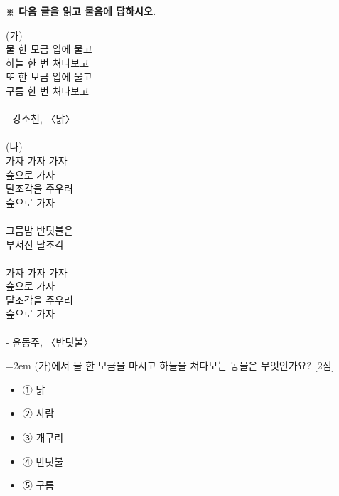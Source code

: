 \documentclass[12pt,a4paper]{article}
\newcommand{\qnum}[1]{%
  \tikz[baseline=(num.base)]{%
    \node[circle, fill=numCircle, text=white, inner sep=0pt,
          minimum size=18pt, font=\small\bfseries] (num) {#1};%
  }%
}
\newcommand{\pts}[1]{%
  \hfill\textcolor{ptsBadge}{[#1점]}%
}
\begin{document}
\vspace{4mm}
{\small\textbf{※ 다음 글을 읽고 물음에 답하시오.}}
\vspace{2mm}
\begin{tcolorbox}[passage]
(가) \\{}
물 한 모금 입에 물고 \\{}
하늘 한 번 쳐다보고 \\{}
또 한 모금 입에 물고 \\{}
구름 한 번 쳐다보고 \\{}
\vspace{4pt} \\{}
\hfill - 강소천, 〈닭〉 \\{}
\vspace{4pt} \\{}
(나) \\{}
가자 가자 가자 \\{}
숲으로 가자 \\{}
달조각을 주우러 \\{}
숲으로 가자 \\{}
\vspace{4pt} \\{}
그믐밤 반딧불은 \\{}
부서진 달조각 \\{}
\vspace{4pt} \\{}
가자 가자 가자 \\{}
숲으로 가자 \\{}
달조각을 주우러 \\{}
숲으로 가자 \\{}
\vspace{4pt} \\{}
\hfill - 윤동주, 〈반딧불〉
\end{tcolorbox}
\vspace{3mm}
\begin{samepage}
{\hangindent=2em
\qnum{9}\enspace (가)에서 물 한 모금을 마시고 하늘을 쳐다보는 동물은 무엇인가요? \pts{2}
\par}

\vspace{3mm}
\begin{itemize}[leftmargin=2.5em, labelsep=0.3em, label={}, itemsep=4pt, parsep=1pt, topsep=0pt]
  \item ① 닭
  \item ② 사람
  \item ③ 개구리
  \item ④ 반딧불
  \item ⑤ 구름
\end{itemize}
\end{samepage}
\end{document}
